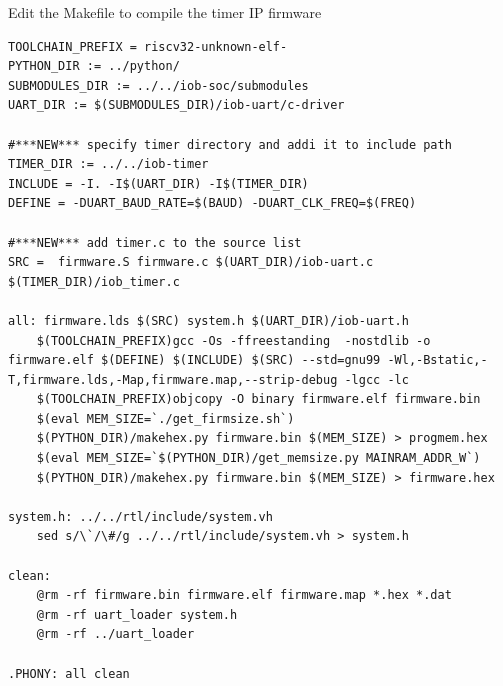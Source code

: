 \documentclass [xcolor=svgnames, t] {beamer}
\begin{document}
\begin{frame}[fragile]{Edit the Makefile to compile the timer IP firmware}
\begin{tiny}
\begin{lstlisting}
TOOLCHAIN_PREFIX = riscv32-unknown-elf-
PYTHON_DIR := ../python/
SUBMODULES_DIR := ../../iob-soc/submodules
UART_DIR := $(SUBMODULES_DIR)/iob-uart/c-driver

#***NEW*** specify timer directory and addi it to include path 
TIMER_DIR := ../../iob-timer
INCLUDE = -I. -I$(UART_DIR) -I$(TIMER_DIR)
DEFINE = -DUART_BAUD_RATE=$(BAUD) -DUART_CLK_FREQ=$(FREQ)

#***NEW*** add timer.c to the source list
SRC =  firmware.S firmware.c $(UART_DIR)/iob-uart.c  $(TIMER_DIR)/iob_timer.c

all: firmware.lds $(SRC) system.h $(UART_DIR)/iob-uart.h
	$(TOOLCHAIN_PREFIX)gcc -Os -ffreestanding  -nostdlib -o firmware.elf $(DEFINE) $(INCLUDE) $(SRC) --std=gnu99 -Wl,-Bstatic,-T,firmware.lds,-Map,firmware.map,--strip-debug -lgcc -lc
	$(TOOLCHAIN_PREFIX)objcopy -O binary firmware.elf firmware.bin
	$(eval MEM_SIZE=`./get_firmsize.sh`)
	$(PYTHON_DIR)/makehex.py firmware.bin $(MEM_SIZE) > progmem.hex
	$(eval MEM_SIZE=`$(PYTHON_DIR)/get_memsize.py MAINRAM_ADDR_W`)
	$(PYTHON_DIR)/makehex.py firmware.bin $(MEM_SIZE) > firmware.hex

system.h: ../../rtl/include/system.vh
	sed s/\`/\#/g ../../rtl/include/system.vh > system.h

clean:
	@rm -rf firmware.bin firmware.elf firmware.map *.hex *.dat
	@rm -rf uart_loader system.h
	@rm -rf ../uart_loader

.PHONY: all clean
\end{lstlisting}
\end{tiny}
\end{frame}
\end{document}
